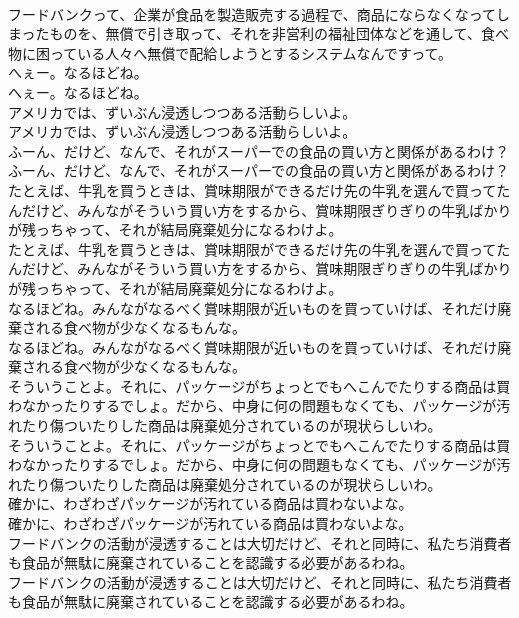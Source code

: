 \documentclass[8pt]{extreport}
\begin{document}
\begin{CJK}{UTF8}{min}
\\	フードバンクって、企業が食品を製造販売する過程で、商品にならなくなってしまったものを、無償で引き取って、それを非営利の福祉団体などを通して、食べ物に困っている人々へ無償で配給しようとするシステムなんですって。 
\\	へぇー。なるほどね。	
\\	へぇー。なるほどね。 
\\	アメリカでは、ずいぶん浸透しつつある活動らしいよ。	
\\	アメリカでは、ずいぶん浸透しつつある活動らしいよ。 
\\	ふーん、だけど、なんで、それがスーパーでの食品の買い方と関係があるわけ？	
\\	ふーん、だけど、なんで、それがスーパーでの食品の買い方と関係があるわけ？ 
\\	たとえば、牛乳を買うときは、賞味期限ができるだけ先の牛乳を選んで買ってたんだけど、みんながそういう買い方をするから、賞味期限ぎりぎりの牛乳ばかりが残っちゃって、それが結局廃棄処分になるわけよ。	
\\	たとえば、牛乳を買うときは、賞味期限ができるだけ先の牛乳を選んで買ってたんだけど、みんながそういう買い方をするから、賞味期限ぎりぎりの牛乳ばかりが残っちゃって、それが結局廃棄処分になるわけよ。 
\\	なるほどね。みんながなるべく賞味期限が近いものを買っていけば、それだけ廃棄される食べ物が少なくなるもんな。	
\\	なるほどね。みんながなるべく賞味期限が近いものを買っていけば、それだけ廃棄される食べ物が少なくなるもんな。 
\\	そういうことよ。それに、パッケージがちょっとでもへこんでたりする商品は買わなかったりするでしょ。だから、中身に何の問題もなくても、パッケージが汚れたり傷ついたりした商品は廃棄処分されているのが現状らしいわ。	
\\	そういうことよ。それに、パッケージがちょっとでもへこんでたりする商品は買わなかったりするでしょ。だから、中身に何の問題もなくても、パッケージが汚れたり傷ついたりした商品は廃棄処分されているのが現状らしいわ。 
\\	確かに、わざわざパッケージが汚れている商品は買わないよな。	
\\	確かに、わざわざパッケージが汚れている商品は買わないよな。 
\\	フードバンクの活動が浸透することは大切だけど、それと同時に、私たち消費者も食品が無駄に廃棄されていることを認識する必要があるわね。	
\\	フードバンクの活動が浸透することは大切だけど、それと同時に、私たち消費者も食品が無駄に廃棄されていることを認識する必要があるわね。 

\end{CJK}
\end{document}
